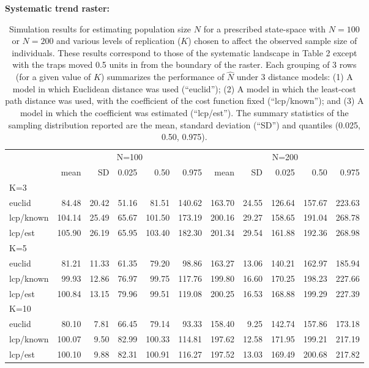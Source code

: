 \documentclass[12pt]{article}
\begin{document}
\begin{spacing}{1.2}
\begin{table}[ht]
{\small
\caption{Simulation results for estimating population size $N$ for a prescribed state-space with
$N=100$ or $N=200$ and various levels of replication ($K$) chosen to affect the observed sample
size of individuals. These results correspond to those of the
systematic landscape in Table 2 except with the traps
moved 0.5 units in from the boundary of the raster.
Each grouping of 3 rows (for a given value of $K$) summarizes the
performance of $\hat{N}$ under 3 distance models: (1) A model in which
Euclidean distance was used (``euclid''); (2) A model in which the
least-cost path distance was used, with the coefficient of the cost
function fixed (``lcp/known''); and (3) A model in which the
coefficient was estimated (``lcp/est''). The summary statistics of the
sampling distribution reported are the mean, standard deviation
(``SD'') and quantiles (0.025, 0.50, 0.975).
}
{\bf Systematic trend raster:} \\
\begin{tabular}{l|rrrrr|rrrrr}
         & \multicolumn{5}{c}{N=100   } & \multicolumn{5}{c}{N=200  }  \\
         &   mean &  SD  & 0.025 & 0.50 & 0.975  & mean  & SD   & 0.025 & 0.50  & 0.975 \\ \hline
K=3      &        &      &       &      &        &       &      &       &       &       \\
euclid   &   84.48& 20.42& 51.16 & 81.51& 140.62 &163.70 &24.55 &126.64 &157.67 &223.63 \\
lcp/known&  104.14& 25.49& 65.67 &101.50& 173.19 &200.16 &29.27 &158.65 &191.04 &268.78\\
lcp/est  &  105.90& 26.19& 65.95 &103.40& 182.30 &201.34 &29.54 &161.88 &192.36 &268.98\\
K=5      &        &      &       &      &        &       &      &       &       &       \\
euclid   & 81.21  &11.33 &61.35  &79.20 & 98.86  &163.27 &13.06 &140.21 &162.97 &185.94\\
lcp/known& 99.93  &12.86 &76.97  &99.75 &117.76  &199.80 &16.60 &170.25 &198.23 &227.66\\
lcp/est  & 100.84 &13.15 &79.96  &99.51 &119.08  &200.25 &16.53 &168.88 &199.29 &227.39\\
K=10     &        &      &       &      &        &       &      &       &       &       \\
euclid   &  80.10 & 7.81 &66.45  &79.14 &93.33   &158.40 & 9.25 &142.74 &157.86 &173.18\\
lcp/known& 100.07 & 9.50 &82.99  &100.33&114.81  &197.62 &12.58 &171.95 &199.21 &217.19\\
lcp/est  & 100.10 & 9.88 &82.31  &100.91&116.27  &197.52 &13.03 &169.49 &200.68 &217.82\\ \hline
\end{tabular}
}
\label{tab.results3}
\end{table}







\end{spacing}
\end{document}
